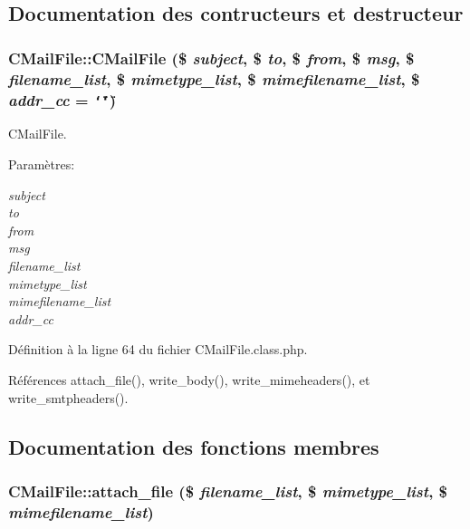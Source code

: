 \subsection{Documentation des contructeurs et destructeur}
\hypertarget{classCMailFile_a0}{
\subsubsection[CMailFile]{\setlength{\rightskip}{0pt plus 5cm}CMail\-File::CMail\-File (\$ {\em subject}, \$ {\em to}, \$ {\em from}, \$ {\em msg}, \$ {\em filename\_\-list}, \$ {\em mimetype\_\-list}, \$ {\em mimefilename\_\-list}, \$ {\em addr\_\-cc} = {\tt \char`\"{}\char`\"{}})}}
\label{classCMailFile_a0}


CMail\-File. 

\begin{Desc}
\item[Param\`{e}tres:]
\begin{description}
\item[{\em subject}]\item[{\em to}]\item[{\em from}]\item[{\em msg}]\item[{\em filename\_\-list}]\item[{\em mimetype\_\-list}]\item[{\em mimefilename\_\-list}]\item[{\em addr\_\-cc}]\end{description}
\end{Desc}


D\'{e}finition \`{a} la ligne 64 du fichier CMail\-File.class.php.

R\'{e}f\'{e}rences attach\_\-file(), write\_\-body(), write\_\-mimeheaders(), et write\_\-smtpheaders().

\subsection{Documentation des fonctions membres}
\hypertarget{classCMailFile_a1}{
\subsubsection[attach\_\-file]{\setlength{\rightskip}{0pt plus 5cm}CMail\-File::attach\_\-file (\$ {\em filename\_\-list}, \$ {\em mimetype\_\-list}, \$ {\em mimefilename\_\-list})}}
\label{classCMailFile_a1}



